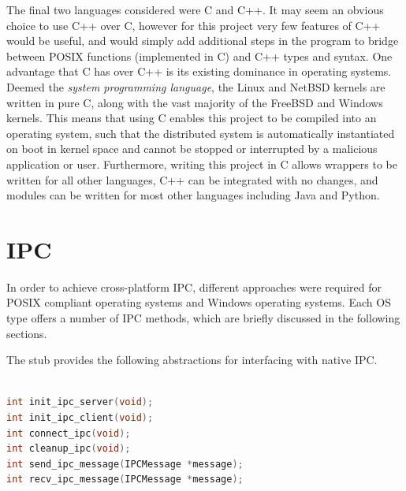 \documentclass[a4paper, 11pt]{report}
\begin{document}
The final two languages considered were C\cite{c} and C++\cite{cpp}. It may seem an obvious choice to use C++ over C, however for this project very few features of C++ would be useful, and would simply add additional steps in the program to bridge between \acrfull{POSIX} functions (implemented in C) and C++ types and syntax. One advantage that C has over C++ is its existing dominance in operating systems. Deemed the \textit{system programming language}, the Linux\cite{linux} and NetBSD\cite{netbsd} kernels are written in pure C, along with the vast majority of the FreeBSD\cite{freebsd} and Windows\cite{windows} kernels. This means that using C enables this project to be compiled into an operating system, such that the distributed system is automatically instantiated on boot in kernel space and cannot be stopped or interrupted by a malicious application or user. Furthermore, writing this project in C allows wrappers to be written for all other languages, C++ can be integrated with no changes, and modules can be written for most other languages including Java and Python.

\section{IPC}
In order to achieve cross-platform \acrshort{IPC}, different approaches were required for \acrfull{POSIX} compliant operating systems and Windows\cite{windows} operating systems. Each \acrshort{OS} type offers a number of \acrshort{IPC} methods, which are briefly discussed in the following sections.

The \gls{stub} provides the following abstractions for interfacing with native \acrshort{IPC}.\\\\

\begin{lstlisting}[language=c,style=c,caption=IPC API]
int init_ipc_server(void);
int init_ipc_client(void);
int connect_ipc(void);
int cleanup_ipc(void);
int send_ipc_message(IPCMessage *message);
int recv_ipc_message(IPCMessage *message);
\end{lstlisting}
\end{document}

